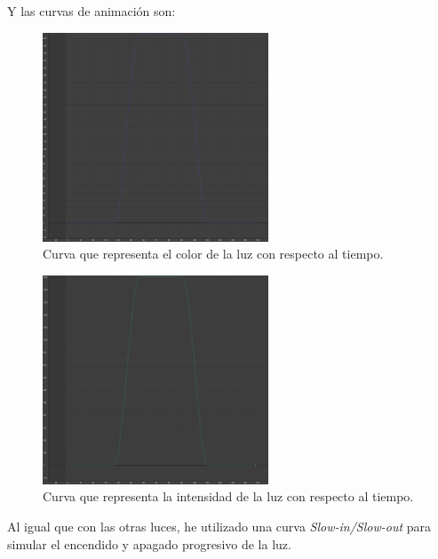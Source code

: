 \newpage

Y las curvas de animación son:

\begin{figure}[H]
   \centering
   \includegraphics[width=0.6\textwidth]{imagenes/curvas/LC/filter.png}
   \caption{Curva que representa el color de la luz con respecto al tiempo.}
\end{figure}

\begin{figure}[H]
   \centering
   \includegraphics[width=0.6\textwidth]{imagenes/curvas/LC/intensity.png}
   \caption{Curva que representa la intensidad de la luz con respecto al tiempo.}
\end{figure}

Al igual que con las otras luces, he utilizado una curva \textit{Slow-in/Slow-out} para simular el encendido y apagado progresivo de la luz.

\newpage